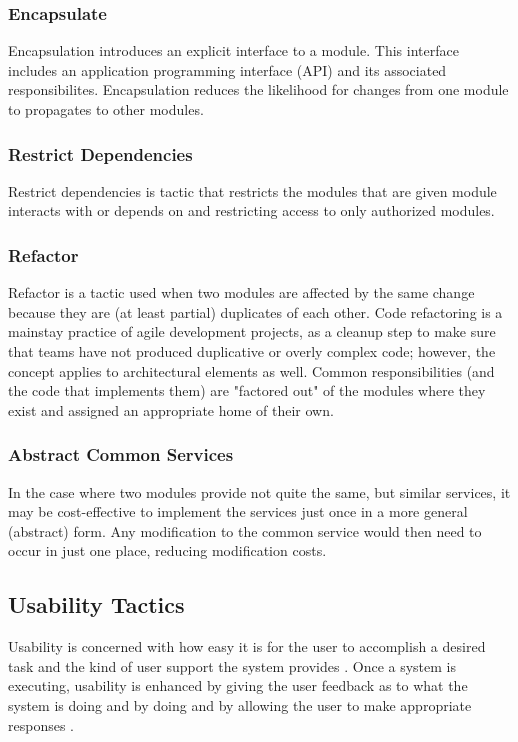 \documentclass{report}
\begin{document}
\subsubsection{Encapsulate}
Encapsulation introduces an explicit interface to a module. This interface includes an application programming interface (API) and its associated responsibilites. Encapsulation reduces the likelihood for changes from one module to propagates to other modules. \cite[p. 123]{book:bass}

\subsubsection{Restrict Dependencies}
Restrict dependencies is tactic that restricts the modules that are given module interacts with or depends on and restricting access to only authorized modules. \cite[p. 124]{book:bass}


\subsubsection{Refactor}
Refactor is a tactic used when two modules are affected by the same change because they are (at least partial) duplicates of each other. Code refactoring is a mainstay practice of agile development projects, as a cleanup step to make sure that teams have not produced duplicative or overly complex code; however, the concept applies to architectural elements as well. Common responsibilities (and the code that implements them) are "factored out" of the modules where they exist and assigned an appropriate home of their own. \cite[p. 124]{book:bass}

\subsubsection{Abstract Common Services}
In the case where two modules provide not quite the same, but similar services, it may be cost-effective to implement the services just once in a more general (abstract) form. Any modification to the common service would then need to occur in just one place, reducing modification costs. \cite[p. 124]{book:bass}


\subsection{Usability Tactics}
Usability is concerned with how easy it is for the user to accomplish a desired task and the kind of user support the system provides \cite[p. 175]{book:bass}. Once a system is executing, usability is enhanced by giving the user feedback as to what the system is doing and by doing and by allowing the user to make appropriate responses \cite[p. 179]{book:bass}.
\end{document}
